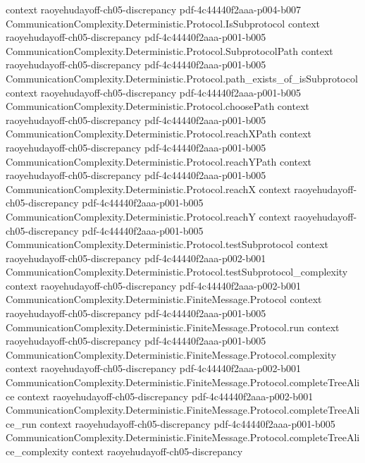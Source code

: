 \begin{lemma}
  {context}
  {raoyehudayoff-ch05-discrepancy}
  {pdf-4c44440f2aaa-p004-b007}
\proofstep
  {CommunicationComplexity.Deterministic.Protocol.IsSubprotocol}
  {context}
  {raoyehudayoff-ch05-discrepancy}
  {pdf-4c44440f2aaa-p001-b005}
\proofstep
  {CommunicationComplexity.Deterministic.Protocol.SubprotocolPath}
  {context}
  {raoyehudayoff-ch05-discrepancy}
  {pdf-4c44440f2aaa-p001-b005}
\proofstep
  {CommunicationComplexity.Deterministic.Protocol.path_exists_of_isSubprotocol}
  {context}
  {raoyehudayoff-ch05-discrepancy}
  {pdf-4c44440f2aaa-p001-b005}
\proofstep
  {CommunicationComplexity.Deterministic.Protocol.choosePath}
  {context}
  {raoyehudayoff-ch05-discrepancy}
  {pdf-4c44440f2aaa-p001-b005}
\proofstep
  {CommunicationComplexity.Deterministic.Protocol.reachXPath}
  {context}
  {raoyehudayoff-ch05-discrepancy}
  {pdf-4c44440f2aaa-p001-b005}
\proofstep
  {CommunicationComplexity.Deterministic.Protocol.reachYPath}
  {context}
  {raoyehudayoff-ch05-discrepancy}
  {pdf-4c44440f2aaa-p001-b005}
\proofstep
  {CommunicationComplexity.Deterministic.Protocol.reachX}
  {context}
  {raoyehudayoff-ch05-discrepancy}
  {pdf-4c44440f2aaa-p001-b005}
\proofstep
  {CommunicationComplexity.Deterministic.Protocol.reachY}
  {context}
  {raoyehudayoff-ch05-discrepancy}
  {pdf-4c44440f2aaa-p001-b005}
\proofstep
  {CommunicationComplexity.Deterministic.Protocol.testSubprotocol}
  {context}
  {raoyehudayoff-ch05-discrepancy}
  {pdf-4c44440f2aaa-p002-b001}
\proofstep
  {CommunicationComplexity.Deterministic.Protocol.testSubprotocol_complexity}
  {context}
  {raoyehudayoff-ch05-discrepancy}
  {pdf-4c44440f2aaa-p002-b001}
\proofstep
  {CommunicationComplexity.Deterministic.FiniteMessage.Protocol}
  {context}
  {raoyehudayoff-ch05-discrepancy}
  {pdf-4c44440f2aaa-p001-b005}
\proofstep
  {CommunicationComplexity.Deterministic.FiniteMessage.Protocol.run}
  {context}
  {raoyehudayoff-ch05-discrepancy}
  {pdf-4c44440f2aaa-p001-b005}
\proofstep
  {CommunicationComplexity.Deterministic.FiniteMessage.Protocol.complexity}
  {context}
  {raoyehudayoff-ch05-discrepancy}
  {pdf-4c44440f2aaa-p002-b001}
\proofstep
  {CommunicationComplexity.Deterministic.FiniteMessage.Protocol.completeTreeAlice}
  {context}
  {raoyehudayoff-ch05-discrepancy}
  {pdf-4c44440f2aaa-p002-b001}
\proofstep
  {CommunicationComplexity.Deterministic.FiniteMessage.Protocol.completeTreeAlice_run}
  {context}
  {raoyehudayoff-ch05-discrepancy}
  {pdf-4c44440f2aaa-p001-b005}
\proofstep
  {CommunicationComplexity.Deterministic.FiniteMessage.Protocol.completeTreeAlice_complexity}
  {context}
  {raoyehudayoff-ch05-discrepancy}

\end{lemma}
